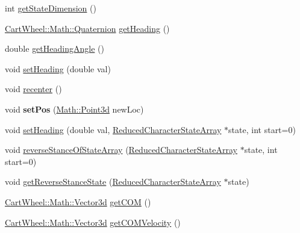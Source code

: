 \begin{DoxyCompactItemize}
\item 
int \hyperlink{classCartWheel_1_1Core_1_1Character_a5143906f573098dcdb77419ca5deb643}{getStateDimension} ()
\item 
\hyperlink{classCartWheel_1_1Math_1_1Quaternion}{CartWheel::Math::Quaternion} \hyperlink{classCartWheel_1_1Core_1_1Character_a17640e521bf8b1eab82c10cec6175f14}{getHeading} ()
\item 
double \hyperlink{classCartWheel_1_1Core_1_1Character_ac9c987a3deecb7d310d2baae5830fae6}{getHeadingAngle} ()
\item 
void \hyperlink{classCartWheel_1_1Core_1_1Character_a7d4dcfcc3d50dc91602a7eb9b99a1643}{setHeading} (double val)
\item 
void \hyperlink{classCartWheel_1_1Core_1_1Character_a4f837b80e4f72d1b7c995723317d4c37}{recenter} ()
\item 
\hypertarget{classCartWheel_1_1Core_1_1Character_a60875dddd5fe6123baff34e37b19f1d0}{
void {\bfseries setPos} (\hyperlink{classCartWheel_1_1Math_1_1Point3d}{Math::Point3d} newLoc)}
\label{classCartWheel_1_1Core_1_1Character_a60875dddd5fe6123baff34e37b19f1d0}

\item 
void \hyperlink{classCartWheel_1_1Core_1_1Character_af68429bd47e8f545ae958fec490eeea8}{setHeading} (double val, \hyperlink{classCartWheel_1_1Core_1_1ReducedCharacterStateArray}{ReducedCharacterStateArray} $\ast$state, int start=0)
\item 
void \hyperlink{classCartWheel_1_1Core_1_1Character_a58222b9166b9117f02ccf7c62c81e8e6}{reverseStanceOfStateArray} (\hyperlink{classCartWheel_1_1Core_1_1ReducedCharacterStateArray}{ReducedCharacterStateArray} $\ast$state, int start=0)
\item 
void \hyperlink{classCartWheel_1_1Core_1_1Character_a158fb4154cc111f834731848dd9ca3d8}{getReverseStanceState} (\hyperlink{classCartWheel_1_1Core_1_1ReducedCharacterStateArray}{ReducedCharacterStateArray} $\ast$state)
\item 
\hyperlink{classCartWheel_1_1Math_1_1Vector3d}{CartWheel::Math::Vector3d} \hyperlink{classCartWheel_1_1Core_1_1Character_afbe6ac8fd32f7b5a40bd9261532ea8b6}{getCOM} ()
\item 
\hyperlink{classCartWheel_1_1Math_1_1Vector3d}{CartWheel::Math::Vector3d} \hyperlink{classCartWheel_1_1Core_1_1Character_a74b600f6ada76d3090d15c260deab585}{getCOMVelocity} ()
\end{DoxyCompactItemize}
